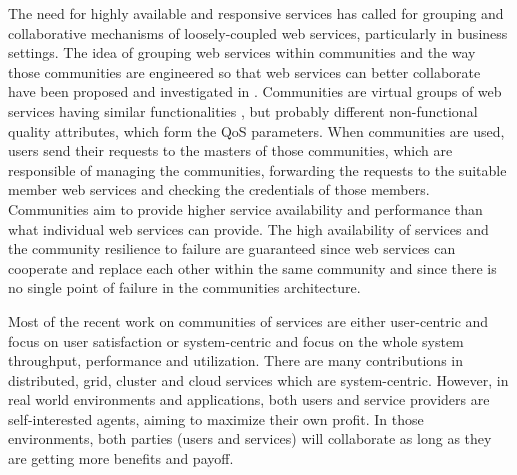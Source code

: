 The need for highly available and responsive services has called
for grouping and collaborative mechanisms of loosely-coupled web
services, particularly in business settings. The idea of grouping
web services within communities and the way those communities are
engineered so that web services can better collaborate have been
proposed and investigated in
\cite{DBLP:journals/ijebr/MaamarSTBB09,DBLP:journals/internet/BenatallahSD03,Rosario:2008:PQS:1512146.1512290}.
Communities are virtual groups of web services having similar
functionalities \cite{Zeng:2003:QDW:775152.775211, Paik:2005:TSS:2229263.2230038,Medjahed05adynamic,10.1109/ARES.2008.7}, but probably different non-functional quality
attributes, which form the QoS parameters. When communities are
used, users send their requests to the masters of those
communities, which are responsible of managing the communities,
forwarding the requests to the suitable member web services and
checking the credentials of those members. Communities aim to
provide higher service availability and performance than what
individual web services can provide. The high availability of
services and the community resilience to failure are guaranteed
since web services can cooperate and replace each other within the
same community and since there is no single point of failure in
the communities architecture.

Most of the recent work on communities of services are either
user-centric and focus on user satisfaction
\cite{Chun02user-centricperformance} or system-centric and focus
on the whole system throughput, performance and utilization. There
are many contributions in distributed, grid, cluster and cloud
services which are system-centric. However, in real world
environments and applications, both users and service providers
are self-interested agents, aiming to maximize their own profit.
In those environments, both parties (users and services) will
collaborate as long as they are getting more benefits and payoff.

